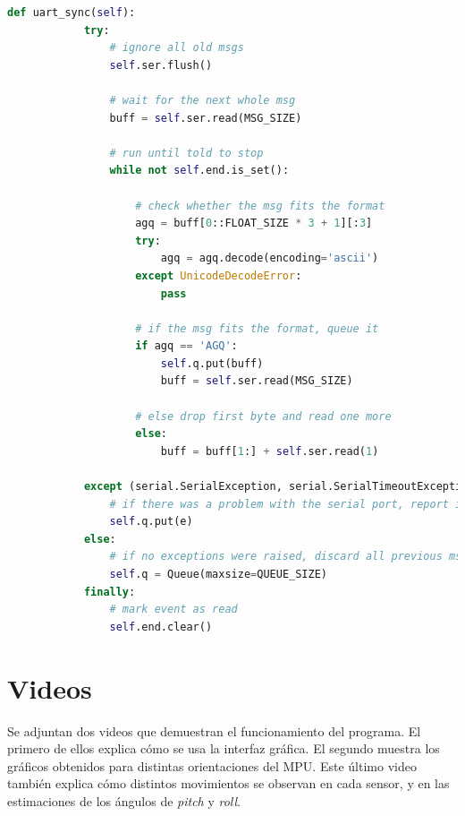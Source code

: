 \documentclass{article}
\begin{document}
\begin{center}
	\begin{lstlisting}[language=Python]
		def uart_sync(self):
			try:
				# ignore all old msgs
				self.ser.flush()
				
				# wait for the next whole msg
				buff = self.ser.read(MSG_SIZE)
				
				# run until told to stop
				while not self.end.is_set():
					
					# check whether the msg fits the format
					agq = buff[0::FLOAT_SIZE * 3 + 1][:3]
					try:
						agq = agq.decode(encoding='ascii')
					except UnicodeDecodeError:
						pass
					
					# if the msg fits the format, queue it
					if agq == 'AGQ':
						self.q.put(buff)
						buff = self.ser.read(MSG_SIZE)
					
					# else drop first byte and read one more
					else:
						buff = buff[1:] + self.ser.read(1)
			
			except (serial.SerialException, serial.SerialTimeoutException) as e:
				# if there was a problem with the serial port, report it
				self.q.put(e) 
			else:
				# if no exceptions were raised, discard all previous msgs
				self.q = Queue(maxsize=QUEUE_SIZE)
			finally:
				# mark event as read
				self.end.clear()
	\end{lstlisting}
\end{center}


\section{Videos}

Se adjuntan dos videos que demuestran el funcionamiento del programa. El primero de ellos explica c\'omo se usa la interfaz gr\'afica. El segundo muestra los gr\'aficos obtenidos para distintas orientaciones del MPU. Este \'ultimo video tambi\'en explica c\'omo distintos movimientos se observan en cada sensor, y en las estimaciones de los \'angulos de \emph{pitch} y \emph{roll}.
\end{document}

